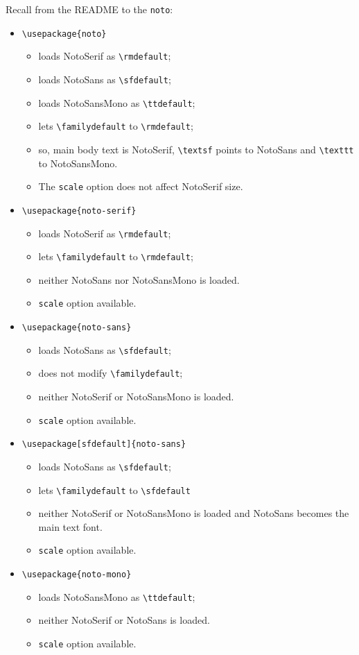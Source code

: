 \documentclass[]{article}
\begin{document}
Recall from the README to the {\tt noto}:
\begin{itemize}
\item
\verb|\usepackage{noto}|
   \begin{itemize}
   \item loads NotoSerif as \verb|\rmdefault|;
   \item loads NotoSans as \verb|\sfdefault|;
  \item loads NotoSansMono as \verb|\ttdefault|;
   \item lets \verb|\familydefault| to \verb|\rmdefault|;
   \item so, main body text is NotoSerif, \verb|\textsf| points to NotoSans and \verb|\texttt| to NotoSansMono. 
   \item The {\tt scale} option does not affect NotoSerif size.
   \end{itemize}
\item
\verb|\usepackage{noto-serif}|
   \begin{itemize}
   \item loads NotoSerif as \verb|\rmdefault|;
   \item lets \verb|\familydefault| to \verb|\rmdefault|;
   \item neither NotoSans nor NotoSansMono is loaded.
   \item {\tt scale} option available.
   \end{itemize}
\item
\verb|\usepackage{noto-sans}|
   \begin{itemize}
   \item loads NotoSans as \verb|\sfdefault|;
   \item does not modify \verb|\familydefault|;
   \item neither NotoSerif or NotoSansMono is loaded.
   \item {\tt scale} option available.
\end{itemize}
\item
\verb|\usepackage[sfdefault]{noto-sans}| 
   \begin{itemize}
   \item loads NotoSans as \verb|\sfdefault|;
   \item lets \verb|\familydefault| to \verb|\sfdefault|
   \item neither NotoSerif or NotoSansMono is loaded and NotoSans becomes the main text font.
      \item {\tt scale} option available.
\end{itemize}
\item
\verb|\usepackage{noto-mono}|
   \begin{itemize}
   \item loads NotoSansMono as \verb|\ttdefault|;
   \item neither NotoSerif or NotoSans is loaded.   
      \item {\tt scale} option available.
\end{itemize}
\end{itemize}
\end{document}
